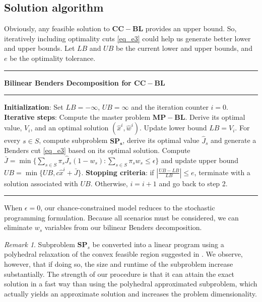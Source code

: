 \documentclass[journal]{IEEEtran}
\theoremstyle{remark}
\newtheorem{remark}{Remark}
\begin{document}
\subsection{Solution algorithm}
Obviously, any feasible solution to $\mathbf{CC-BL}$ provides an upper bound. So, iteratively including optimality cuts \eqref{eq_e3} could help us generate better lower and upper bounds. Let $LB$ and $UB$ be the current lower and upper bounds, and $e$ be the optimality tolerance. \\
\hrule\vspace{2mm}
\textbf{Bilinear Benders Decomposition for $\mathbf{CC-BL}$}
\hrule\vspace{2mm}
\begin{outline}[enumerate]
\1 \textbf{Initialization}: Set $LB = -\infty$, $UB= \infty$ and the iteration counter $i=0$.
\1 \textbf{Iterative steps}:
    \2 Compute the master problem $\mathbf{MP-BL}$. Derive its optimal value, $V_i$, and an optimal solution $(\hat x^i, \hat w^i)$. Update lower bound $LB= V_i$.
    \2 For  every $s\in S$, compute subproblem $\mathbf{SP_s}$, derive its optimal value $\hat J_s$ and generate a Benders cut  \eqref{eq_e3} based on its optimal solution.
    \2 Compute $\bar J = \min \{\displaystyle\sum_{s\in S} \pi_s\hat J_s(1-w_s): \displaystyle\sum_{s\in S}\pi_sw_s\leq \epsilon\}$ and update upper bound $UB= \min\{UB, c\hat x^i+\bar J\}$.
\1 \textbf{Stopping criteria}: if $|\frac{UB-LB}{LB}| \le e$, terminate with a solution associated with $UB$. Otherwise, $i=i+1$ and go back to step 2.

\vspace{2mm}
\hrule\vspace{2mm}
\end{outline}
When $\epsilon=0$, our chance-constrained model reduces to the stochastic programming formulation. Because all scenarios must be considered, we can eliminate $w_s$ variables from our bilinear Benders decomposition.


\begin{remark}
Subproblem $\mathbf{SP}_s$ be converted into a linear program using a polyhedral relaxation of the convex feasible region suggested in \citep{Ben-Tal}. We observe, however, that if doing so, the size and runtime of the subproblem increase substantially. The strength of our procedure is that it can attain the exact solution in a fast way than using the polyhedral approximated subproblem, which actually yields an approximate solution and increases the problem dimensionality.
\end{remark}
\end{document}
